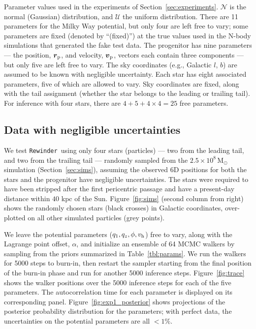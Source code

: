 \documentclass{emulateapj}
\newcommand{\msun}{\mathrm{M}_\odot}
\newcommand{\bs}{\boldsymbol}
\newcommand{\Loffset}{\alpha}
\newcommand{\vhalo}{v_{\rm h}}
\newcommand{\rewinder}{\texttt{Rewinder}}
\begin{document}
\begin{table*}[ht]
\begin{center}
	\caption{Parameter values used in the experiments of Section~\ref{sec:experiments}. $\mathcal{N}$ is the normal (Gaussian) distribution, and $\mathcal{U}$ the uniform distribution. There are 11 parameters for the Milky Way potential, but only four are left free to vary; some parameters are fixed (denoted by ``(fixed)'') at the true values used in the N-body simulations that generated the fake test data. The progenitor has nine parameters --- the position, $\bs{r}_{\rm p}$, and velocity, $\bs{v}_{\rm p}$, vectors each contain three components --- but only five are left free to vary. The sky coordinates (e.g., Galactic $l$, $b$) are assumed to be known with negligible uncertainty. Each star has eight associated parameters, five of which are allowed to vary. Sky coordinates are fixed, along with the tail assignment (whether the star belongs to the leading or trailing tail). For inference with four stars, there are $4+5+4\times4=25$ free parameters. \label{tbl:params}}
\end{center}
\end{table*}

\subsection{Data with negligible uncertainties}\label{sec:exp1}

We test \rewinder\ using only four stars (particles) --- two from the leading tail, and two from the trailing tail --- randomly sampled from the $2.5\times10^8\,\msun$ simulation (Section~\ref{sec:sims}), assuming the observed 6D positions for both the stars and the progenitor have negligible uncertainties. The stars were required to have been stripped after the first pericentric passage and have a present-day distance within $40$ kpc of the Sun. Figure~\ref{fig:sims} (second column from right) shows the randomly chosen stars (black crosses) in Galactic coordinates, over-plotted on all other simulated particles (grey points). 

We leave the potential parameters ($q_1,q_z,\phi,\vhalo$) free to vary, along with the Lagrange point offset, $\Loffset$, and initialize an ensemble of 64 MCMC walkers by sampling from the priors summarized in Table~\ref{tbl:params}. We run the walkers for 5000 steps to burn-in, then restart the sampler starting from the final position of the burn-in phase and run for another 5000 inference steps. Figure~\ref{fig:trace} shows the walker positions over the 5000 inference steps for each of the five parameters. The autocorrelation time for each parameter is displayed on its corresponding panel. Figure~\ref{fig:exp1_posterior} shows projections of the posterior probability distribution for the parameters; with perfect data, the uncertainties on the potential parameters are all $<1\%$.
\end{document}
